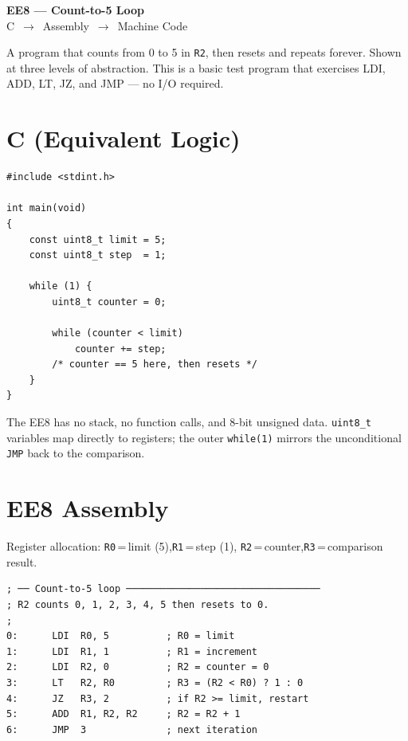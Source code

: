 \documentclass[11pt,a4paper]{article}
\newcommand{\reg}[1]{\texttt{R#1}}
\begin{document}
\begin{center}
  {\LARGE\bfseries EE8 --- Count-to-5 Loop}\\[6pt]
  {\large C $\,\to\,$ Assembly $\,\to\,$ Machine Code}
\end{center}
\vspace{1em}

\noindent
A program that counts from 0 to 5 in \reg{2}, then resets and repeats
forever. Shown at three levels of abstraction. This is a basic test
program that exercises LDI, ADD, LT, JZ, and JMP --- no I/O required.

\section{C (Equivalent Logic)}

\begin{lstlisting}[style=cstyle]
#include <stdint.h>

int main(void)
{
    const uint8_t limit = 5;
    const uint8_t step  = 1;

    while (1) {
        uint8_t counter = 0;

        while (counter < limit)
            counter += step;
        /* counter == 5 here, then resets */
    }
}
\end{lstlisting}

\begin{notebox}
The EE8 has no stack, no function calls, and 8-bit unsigned data.
\texttt{uint8\_t} variables map directly to registers; the outer
\texttt{while(1)} mirrors the unconditional \texttt{JMP} back to the
comparison.
\end{notebox}

\section{EE8 Assembly}

\noindent
Register allocation: \reg{0}\,=\,limit (5),\quad \reg{1}\,=\,step (1),\quad
\reg{2}\,=\,counter,\quad \reg{3}\,=\,comparison result.

\begin{lstlisting}[style=asmstyle]
; ── Count-to-5 loop ──────────────────────────────────
; R2 counts 0, 1, 2, 3, 4, 5 then resets to 0.
;
0:      LDI  R0, 5          ; R0 = limit
1:      LDI  R1, 1          ; R1 = increment
2:      LDI  R2, 0          ; R2 = counter = 0
3:      LT   R2, R0         ; R3 = (R2 < R0) ? 1 : 0
4:      JZ   R3, 2          ; if R2 >= limit, restart
5:      ADD  R1, R2, R2     ; R2 = R2 + 1
6:      JMP  3              ; next iteration
\end{lstlisting}
\end{document}
